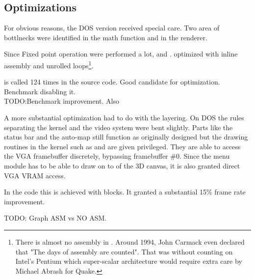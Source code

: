 \subsection{Optimizations}
For obvious reasons, the DOS version received special care. Two area of bottlnecks were identified in the math function and in the renderer.\\
\par
Since Fixed point operation were performed a lot,  and  .  optimized with inline assembly and unrolled loops\footnote{There is almost no assembly in \doom. Around 1994, John Carmack even declared that "The days of assembly are counted". That was without counting on Intel's Pentium which super-scalar architecture would require extra care by Michael Abrash for Quake.}.\\
\par
{} is called 124 times in the source code. Good candidate for optimization. Benchmark disabling it.\\
TODO:Benchmark improvement. Also \\
\par
A more substantial optimization had to do with the layering. On DOS the rules separating the kernel and the video system were bent slightly. Parts like the status bar and the auto-map still function as originally designed but the drawing routines in the kernel such as  and  are given privileged. They are able to access the VGA framebuffer discretely, bypassing framebuffer \#0. Since the menu module has to be able to draw on to of the 3D canvas, it is also granted direct VGA VRAM access.\\
\par
In the code this is achieved with  blocks. It granted a substantial 15\% frame rate improvement.\\
 \par 
TODO: Graph ASM vs NO ASM.\\
 \par
\par




